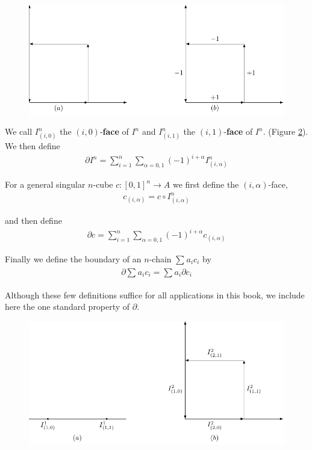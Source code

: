 \begin{figure}[!htb]
    \centering
    \includegraphics[width=.75\linewidth]{./pics/Fig4-4.pdf}
    \caption{}
    \label{Fig 4-4}
\end{figure}

We call $I^n_{(i,0)}$ the $(i,0)$-\textbf{face} of $I^n$ and $I^n_{(i,1)}$ the $(i,1)$-\textbf{face} of $I^n$.
(Figure \ref{Fig 4-5}). We then define 
\begin{align*}
    \partial I^n = \sum_{i=1}^n \sum_{\alpha=0,1}(-1)^{i+\alpha}I^n_{(i,\alpha)}
\end{align*}

For a general singular $n$-cube $c:[0,1]^n\to A$ we first define the $(i,\alpha)$-face,
\begin{align*}
    c_{(i,\alpha)} = c\circ I^n_{(i,\alpha)}
\end{align*}

and then define 
\begin{align*}
    \partial c = \sum_{i=1}^n \sum_{\alpha=0,1}(-1)^{i+\alpha}c_{(i,\alpha)}
\end{align*}

Finally we define the boundary of an $n$-chain $\sum_{}^{}{a_ic_i}$ by 
\begin{align*}
    \partial \sum_{}^{}{a_ic_i} = \sum_{}^{}{a_i\partial c_i}
\end{align*}

Although these few definitions suffice for all applications in
this book, we include here the one standard property of $\partial$.

\begin{figure}[!htb]
    \centering
    \includegraphics[width=.75\linewidth]{./pics/Fig4-5.pdf}
    \caption{}
    \label{Fig 4-5}
\end{figure}

